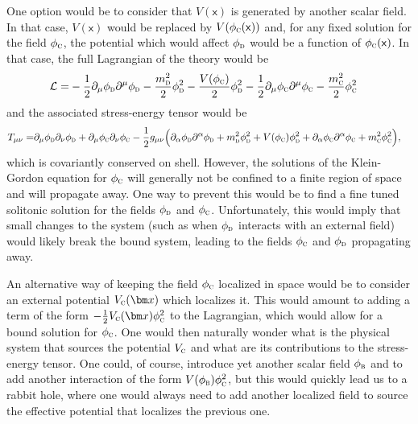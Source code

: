 \documentclass[letterpaper,12pt,titlepage,oneside,final]{book}
\newcommand{\mf}{\mathsf}%
\newcommand{\tc}[1]{\textsc{#1}}
\begin{document}
One option would be to consider that $V(\mf x)$ is generated by another scalar field. In that case, $V(\mf x)$ would be replaced by $V(\phi_\tc{c}(\mf x))$ and, for any fixed solution for the field $\phi_\tc{c}$, the potential which would affect $\phi_\tc{d}$ would be a function of $\phi_\tc{c}(\mf x)$. In that case, the full Lagrangian of the theory would be 
\begin{equation}
\begin{aligned}
    \mathcal{L} =& - \frac{1}{2} \partial_\mu\phi_{\tc{d}}\partial^\mu\phi_{\tc{d}} - \frac{m_\tc{d}^2}{2} \phi_{\tc{d}}^2 -\frac{V(\phi_\tc{c})}{2}\phi^2_\tc{d}
    - \frac{1}{2} \partial_\mu\phi_\tc{c}\partial^\mu \phi_\tc{c} - \frac{m_\tc{c}^2}{2}\phi_\tc{c}^2
\end{aligned}
\end{equation}
and the associated stress-energy tensor would be
\begin{equation}
\begin{aligned}
    T_{\mu\nu} =& \partial_\mu \phi_{\tc{d}}\partial_\nu \phi_{\tc{d}}+\partial_\mu \phi_{\tc{c}}\partial_\nu \phi_{\tc{c}}-\frac{1}{2}g_{\mu\nu}\Big(\partial_\alpha \phi_{\tc{d}}\partial^\alpha \phi_{\tc{d}} + m_{\tc{d}}^2 \phi_\tc{d}^2 + V(\phi_\tc{c})\phi_\tc{d}^2+ \partial_\alpha \phi_{\tc{c}}\partial^\alpha \phi_{\tc{c}} + m_{\tc{c}}^2 \phi_\tc{c}^2\Big){,}
\end{aligned}
\end{equation}
which is covariantly conserved on shell. However, the solutions of the Klein-Gordon equation for $\phi_\tc{c}$ will generally not be confined to a finite region of space and will propagate away. One way to prevent this would be to find a fine tuned solitonic solution for the fields $\phi_\tc{d}$ and $\phi_\tc{c}$. Unfortunately, this would imply that small changes to the system (such as when $\phi_\tc{d}$ interacts with an external field) would likely break the bound system, leading to the fields $\phi_\tc{c}$ and $\phi_\tc{d}$ propagating away.

An alternative way of keeping the field $\phi_\tc{c}$ localized in space would be to consider an external potential $V_\tc{c}(\bm x)$ which localizes it. This would amount to adding a term of the form $- \frac{1}{2}V_\tc{c}(\bm x) \phi_\tc{c}^2$ to the Lagrangian, which would allow for a bound solution for $\phi_\tc{c}$. One would then naturally wonder what is the physical system that sources the potential $V_\tc{c}$ and what are its contributions to the stress-energy tensor. One could, of course, introduce yet another scalar field $\phi_\tc{b}$ and to add another interaction of the form $V(\phi_\tc{b})\phi_\tc{c}^2$, but this would quickly lead us to a rabbit hole, where one would always need to add another localized field to source the effective potential that localizes the previous one.
\end{document}
